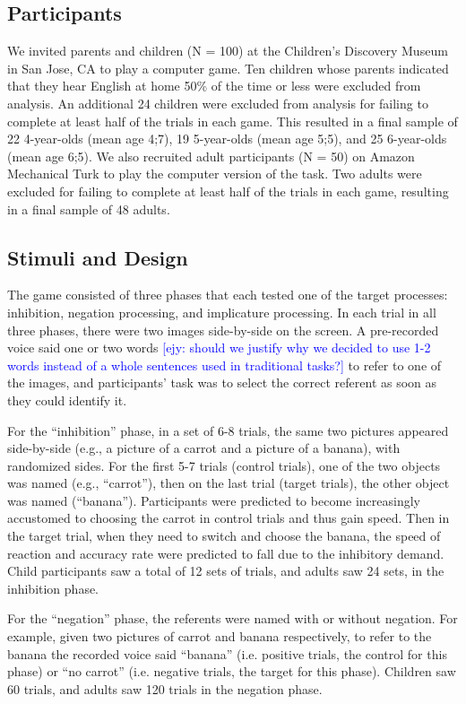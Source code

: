 \documentclass[10pt,letterpaper]{article}
\newcommand{\ejy}[1]{\textcolor{Blue}{[ejy: #1]}}
\begin{document}
\subsection{Participants}

We invited parents and children (N = 100) at the Children's Discovery Museum in San Jose, CA to play a computer game.  Ten children whose parents indicated that they hear English at home 50\% of the time or less were excluded from analysis.  An additional 24 children were excluded from analysis for failing to complete at least half of the trials in each game.  This resulted in a final sample of 22 4-year-olds (mean age 4;7), 19 5-year-olds (mean age 5;5), and 25 6-year-olds (mean age 6;5).  We also recruited adult participants (N = 50) on Amazon Mechanical Turk to play the computer version of the task.  Two adults were excluded for failing to complete at least half of the trials in each game, resulting in a final sample of 48 adults.  

\subsection{Stimuli and Design}

The game consisted of three phases that each tested one of the target processes: inhibition, negation processing, and implicature processing.  In each trial in all three phases, there were two images side-by-side on the screen. A pre-recorded voice said one or two words \ejy{should we justify why we decided to use 1-2 words instead of a whole sentences used in traditional tasks?} to refer to one of the images, and participants' task was to select the correct referent as soon as they could identify it.

For the ``inhibition'' phase, in a set of 6-8 trials, the same two pictures appeared side-by-side (e.g., a picture of a carrot and a picture of a banana), with randomized sides. For the first 5-7 trials (control trials), one of the two objects was named (e.g., ``carrot''), then on the last trial  (target trials), the other object was named (``banana''). Participants were predicted to become increasingly accustomed to choosing the carrot in control trials and thus gain speed. Then in the target trial, when they need to switch and choose the banana, the speed of reaction and accuracy rate were predicted to fall due to the inhibitory demand. Child participants saw a total of 12 sets of trials, and adults saw 24 sets, in the inhibition phase.

For the ``negation'' phase, the referents were named with or without negation. For example, given two pictures of carrot and banana respectively, to refer to the banana the recorded voice said ``banana'' (i.e. positive trials, the control for this phase) or ``no carrot'' (i.e. negative trials, the target for this phase). Children saw 60 trials, and adults saw 120 trials in the negation phase. 
\end{document}
